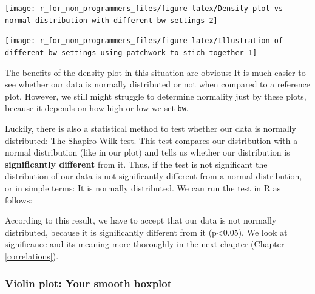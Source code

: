 \documentclass[
]{book}
\newenvironment{Shaded}{\begin{snugshade}}{\end{snugshade}}
\newcommand{\DocumentationTok}[1]{\textcolor[rgb]{0.56,0.35,0.01}{\textbf{\textit{#1}}}}
\newcommand{\FunctionTok}[1]{\textcolor[rgb]{0.00,0.00,0.00}{#1}}
\newcommand{\NormalTok}[1]{#1}
\newcommand{\SpecialCharTok}[1]{\textcolor[rgb]{0.00,0.00,0.00}{#1}}
\begin{document}
\begin{center}\texttt{[image: r\_for\_non\_programmers\_files/figure-latex/Density plot vs normal distribution with different bw settings-2]} \end{center}

\begin{center}\texttt{[image: r\_for\_non\_programmers\_files/figure-latex/Illustration of different bw settings using patchwork to stich together-1]} \end{center}

The benefits of the density plot in this situation are obvious: It is much easier to see whether our data is normally distributed or not when compared to a reference plot. However, we still might struggle to determine normality just by these plots, because it depends on how high or low we set \texttt{bw}.

Luckily, there is also a statistical method to test whether our data is normally distributed: The Shapiro-Wilk test. This test compares our distribution with a normal distribution (like in our plot) and tells us whether our distribution is \textbf{significantly different} from it. Thus, if the test is not significant the distribution of our data is not significantly different from a normal distribution, or in simple terms: It is normally distributed. We can run the test in R as follows:

\begin{Shaded}
\end{Shaded}

According to this result, we have to accept that our data is not normally distributed, because it is significantly different from it (p\textless0.05). We look at significance and its meaning more thoroughly in the next chapter (Chapter \ref{correlations}).

\hypertarget{violin-plot}{%
\subsubsection{Violin plot: Your smooth boxplot}\label{violin-plot}}
\end{document}
